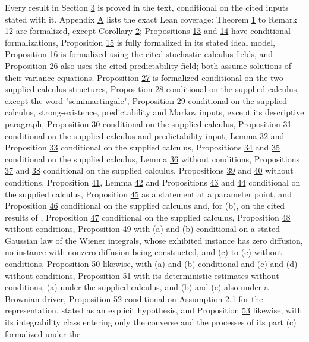 \documentclass[11pt]{article}
\begin{document}
Every result in Section \hyperref[sec:3]{3} is proved in the text, conditional on the cited inputs stated with it. Appendix \hyperref[sec:A]{A} lists the exact Lean coverage: Theorem \hyperref[res:Theorem-1]{1} to Remark 12 are formalized, except Corollary \hyperref[res:Corollary-2]{2}; Propositions \hyperref[res:Proposition-13]{13} and \hyperref[res:Proposition-14]{14} have conditional formalizations, Proposition \hyperref[res:Proposition-15]{15} is fully formalized in its stated ideal model, Proposition \hyperref[res:Proposition-16]{16} is formalized using the cited stochastic-calculus fields, and Proposition \hyperref[res:Proposition-26]{26} also uses the cited predictability field; both assume solutions of their variance equations. Proposition \hyperref[res:Proposition-27]{27} is formalized conditional on the two supplied calculus structures, Proposition \hyperref[res:Proposition-28]{28} conditional on the supplied calculus, except the word "semimartingale", Proposition \hyperref[res:Proposition-29]{29} conditional on the supplied calculus, strong-existence, predictability and Markov inputs, except its descriptive paragraph, Proposition \hyperref[res:Proposition-30]{30} conditional on the supplied calculus, Proposition \hyperref[res:Proposition-31]{31} conditional on the supplied calculus and predictability input, Lemma \hyperref[res:Lemma-32]{32} and Proposition \hyperref[res:Proposition-33]{33} conditional on the supplied calculus, Propositions \hyperref[res:Proposition-34]{34} and \hyperref[res:Proposition-35]{35} conditional on the supplied calculus, Lemma \hyperref[res:Lemma-36]{36} without conditions, Propositions \hyperref[res:Proposition-37]{37} and \hyperref[res:Proposition-38]{38} conditional on the supplied calculus, Propositions \hyperref[res:Proposition-39]{39} and \hyperref[res:Proposition-40]{40} without conditions, Proposition \hyperref[res:Proposition-41]{41}, Lemma \hyperref[res:Lemma-42]{42} and Propositions \hyperref[res:Proposition-43]{43} and \hyperref[res:Proposition-44]{44} conditional on the supplied calculus, Proposition \hyperref[res:Proposition-45]{45} as a statement at a parameter point, and Proposition \hyperref[res:Proposition-46]{46} conditional on the supplied calculus and, for (b), on the cited results of \cite{filipovic2000exponential}, Proposition \hyperref[res:Proposition-47]{47} conditional on the supplied calculus, Proposition \hyperref[res:Proposition-48]{48} without conditions, Proposition \hyperref[res:Proposition-49]{49} with (a) and (b) conditional on a stated Gaussian law of the Wiener integrals, whose exhibited instance has zero diffusion, no instance with nonzero diffusion being constructed, and (c) to (e) without conditions, Proposition \hyperref[res:Proposition-50]{50} likewise, with (a) and (b) conditional and (c) and (d) without conditions, Proposition \hyperref[res:Proposition-51]{51} with its deterministic estimates without conditions, (a) under the supplied calculus, and (b) and (c) also under a Brownian driver, Proposition \hyperref[res:Proposition-52]{52} conditional on Assumption 2.1 for the representation, stated as an explicit hypothesis, and Proposition \hyperref[res:Proposition-53]{53} likewise, with its integrability class entering only the converse and the processes of its part (c) formalized under the 
\end{document}
